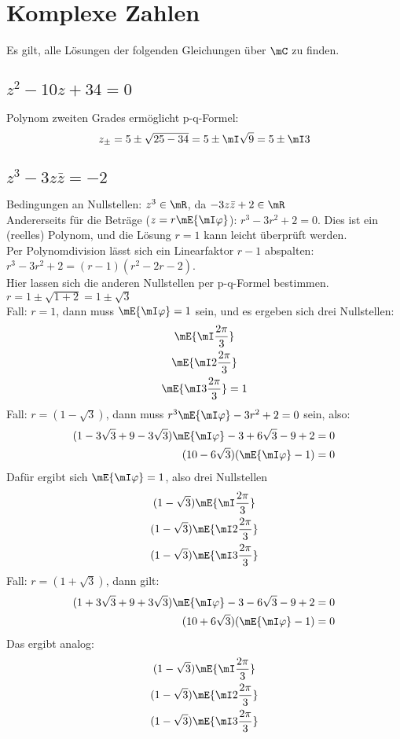 \documentclass[11pt,a4paper]{scrartcl}
\begin{document}
	\section{Komplexe Zahlen}
	Es gilt, alle Lösungen der folgenden Gleichungen über $\mC$ zu finden.
	\subsection{$z^2-10 z + 34= 0$}
	Polynom zweiten Grades ermöglicht p-q-Formel:
	\begin{equation}
		z_\pm = 5 \pm \sqrt{25-34} = 5 \pm \mI \sqrt{9} = 5 \pm \mI 3
	\end{equation}

	\subsection{$z^3-3 z\bar{z} = - 2$}
	Bedingungen an Nullstellen: $z^3 \in \mR$, da $-3z\bar{z}+2\in \mR$\\
	Andererseits für die Beträge ($z=r\mE{\mI\varphi}$): $r^3-3r^2+2=0$. Dies ist ein (reelles) Polynom, und die Lösung $r=1$ kann leicht überprüft werden.\\
	Per Polynomdivision lässt sich ein Linearfaktor $r-1$ abspalten: $r^3-3r^2+2 = (r-1)(r^2-2r-2)$.\\
	Hier lassen sich die anderen Nullstellen per p-q-Formel bestimmen. $r = 1 \pm \sqrt{1+2} = 1\pm\sqrt{3}$\\
	Fall: $r = 1$, dann muss $\mE{\mI\varphi} = 1$ sein, und es ergeben sich drei Nullstellen: 
	\begin{gather}
		\mE{\mI\frac{2\pi}{3}} \\
		\mE{\mI 2\frac{2\pi}{3}}\\
		\mE{\mI 3\frac{2\pi}{3}}=1
	\end{gather}
	Fall: $r = (1 - \sqrt{3})$, dann muss $r^3\mE{\mI\varphi} - 3 r^2 + 2 = 0$ sein, also:
	\begin{align}
		(1 - 3\sqrt{3} + 9 - 3\sqrt{3})\mE{\mI\varphi} - 3 + 6 \sqrt{3} - 9 +2 & = 0 \\
		(10-6\sqrt{3})(\mE{\mI\varphi}-1) & = 0
	\end{align}
	Dafür ergibt sich $\mE{\mI\varphi} = 1$, also drei Nullstellen
	\begin{gather}
		(1 - \sqrt{3})\mE{\mI\frac{2\pi}{3}} \\
		(1 - \sqrt{3})\mE{\mI 2\frac{2\pi}{3}}\\
		(1 - \sqrt{3})\mE{\mI 3\frac{2\pi}{3}}
	\end{gather}
	Fall: $r = (1 + \sqrt{3})$, dann gilt:
	\begin{align}
		(1 + 3\sqrt{3} + 9 + 3\sqrt{3})\mE{\mI\varphi} - 3 - 6 \sqrt{3} - 9 +2 & = 0 \\
		(10+6\sqrt{3})(\mE{\mI\varphi}-1) & = 0
	\end{align}
	Das ergibt analog:
	\begin{gather}
		(1 - \sqrt{3})\mE{\mI\frac{2\pi}{3}} \\
		(1 - \sqrt{3})\mE{\mI 2\frac{2\pi}{3}}\\
		(1 - \sqrt{3})\mE{\mI 3\frac{2\pi}{3}}
	\end{gather}
\end{document}
